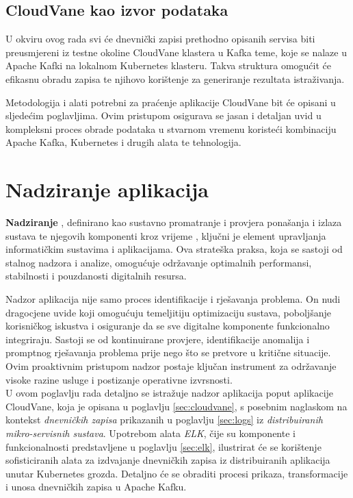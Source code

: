 \documentclass[times, utf8, diplomski]{fer}
\begin{document}
\section{CloudVane kao izvor podataka}

U okviru ovog rada svi će dnevnički zapisi prethodno opisanih servisa biti preusmjereni iz testne okoline CloudVane klastera u Kafka teme, koje se nalaze u Apache Kafki na lokalnom Kubernetes klasteru. Takva struktura omogućit će efikasnu obradu zapisa te njihovo korištenje za generiranje rezultata istraživanja.

Metodologija i alati potrebni za praćenje aplikacije CloudVane bit će opisani u sljedećim poglavljima. Ovim pristupom osigurava se jasan i detaljan uvid u kompleksni proces obrade podataka u stvarnom vremenu koristeći kombinaciju Apache Kafka, Kubernetes i drugih alata te tehnologija.

\chapter{Nadziranje aplikacija}
\label{sec:monitoring}

\textbf{Nadziranje} , definirano kao sustavno promatranje i provjera ponašanja i izlaza sustava te njegovih komponenti kroz vrijeme \citep{monitorama_monitorama_2016}, ključni je element upravljanja informatičkim sustavima i aplikacijama. Ova strateška praksa, koja se sastoji od stalnog nadzora i analize, omogućuje održavanje optimalnih performansi, stabilnosti i pouzdanosti digitalnih resursa.

Nadzor aplikacija nije samo proces identifikacije i rješavanja problema. On nudi dragocjene uvide koji omogućuju temeljitiju optimizaciju sustava, poboljšanje korisničkog iskustva i osiguranje da se sve digitalne komponente funkcionalno integriraju. Sastoji se od kontinuirane provjere, identifikacije anomalija i promptnog rješavanja problema prije nego što se pretvore u kritične situacije. Ovim proaktivnim pristupom nadzor postaje ključan instrument za održavanje visoke razine usluge i postizanje operativne izvrsnosti.\\

U ovom poglavlju rada detaljno se istražuje nadzor aplikacija poput aplikacije CloudVane, koja je opisana u poglavlju \ref{sec:cloudvane}, s posebnim naglaskom na kontekst \emph{dnevničkih zapisa} prikazanih u poglavlju \ref{sec:logs} iz \emph{distribuiranih mikro-servisnih sustava}. Upotrebom alata \emph{ELK}, čije su komponente i funkcionalnosti predstavljene u poglavlju \ref{sec:elk}, ilustrirat će se korištenje sofisticiranih alata za izdvajanje dnevničkih zapisa iz distribuiranih aplikacija unutar Kubernetes grozda. Detaljno će se obraditi procesi prikaza, transformacije i unosa dnevničkih zapisa u Apache Kafku.
\end{document}
